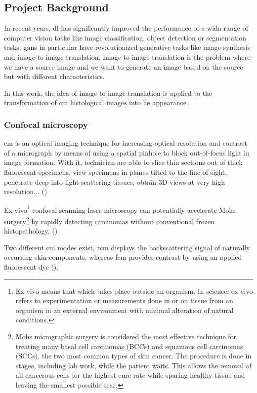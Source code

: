 \documentclass[../main.tex]{subfiles}
\begin{document}
\subsection{Project Background}
\label{sec:project-background}

In recent years, \gls{dl} has significantly improved the
performance of a wida range of computer vision tasks like image classification,
object detection or segmentation tasks.
\gls{gans} in particular have revolutionized generative tasks like image synthesis
and image-to-image translation. Image-to-image translation is the
problem where we have a source image and we want to generate an image
based on the source but with different characteristics.

In this work, the idea of image-to-image translation is applied
to the transformation of \gls{cm} histological images into \gls{he} appearance.

\subsubsection{Confocal microscopy}
\gls{cm} is an optical imaging technique for increasing optical resolution
and contrast of a micrograph by means of using a spatial pinhole to block
out-of-focus light in image formation. With it, technician are able to slice
thin sections out of thick fluorescent specimens, view specimens
in planes tilted to the line of sight, penetrate deep into light-scattering
tissues, obtain 3D views at very high resolution... (\cite{Inoue2006})

Ex vivo\footnote{Ex vivo means that which takes place outside an organism.
In science, ex vivo refers to experimentation or measurements done in or on
tissue from an organism in an external environment with minimal alteration
of natural conditions.} confocal scanning laser microscopy can potentially
accelerate Mohs surgery\footnote{Mohs micrographic surgery is considered the
most effective technique for treating many basal cell carcinomas (BCCs) and
squamous cell carcinomas (SCCs), the two most common types of skin cancer.
The procedure is done in stages, including lab work, while the patient waits.
This allows the removal of all cancerous cells for the highest cure rate
while sparing healthy tissue and leaving the smallest possible scar.}
by rapidly detecting carcinomas without conventional frozen histopathology.
(\cite{Chung2005})

Two different \gls{cm} modes exist, \gls{rcm} displays the backscattering signal
of naturally occurring skin components, whereas \gls{fcm} provides contrast
by using an applied fluorescent dye (\cite{Skvara2012}).
\end{document}
